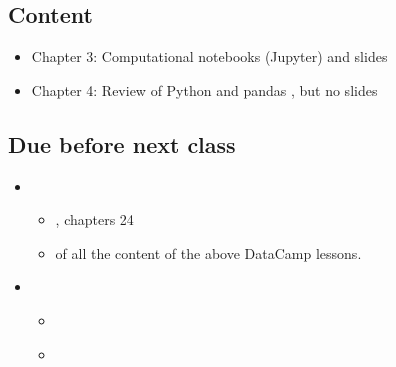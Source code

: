 \documentclass[letterpaper,10pt,english]{sphinxmanual}
\begin{document}
\subsection{Content}
\label{\detokenize{course-schedule:id1}}\begin{itemize}
\item {} 
Chapter 3: Computational notebooks (Jupyter) \sphinxhyphen{} {\hyperref[\detokenize{chapter-3-jupyter::doc}]{}} and slides

\item {} 
Chapter 4: Review of Python and pandas \sphinxhyphen{} {\hyperref[\detokenize{chapter-4-review-of-python-and-pandas::doc}]{}}, but no slides

\end{itemize}


\subsection{Due before next class}
\label{\detokenize{course-schedule:id2}}\begin{itemize}
\item {} 
\begin{itemize}
\item {} 
, chapters 2\sphinxhyphen{}4

\item {} 
 of all the content of the above DataCamp lessons.

\end{itemize}

\item {} 
\begin{itemize}
\item {} 
{\hyperref[\detokenize{chapter-5-before-and-after::doc}]{}}

\item {} 
{\hyperref[\detokenize{chapter-6-single-table-verbs::doc}]{}}

\end{itemize}

\end{itemize}
\end{document}
